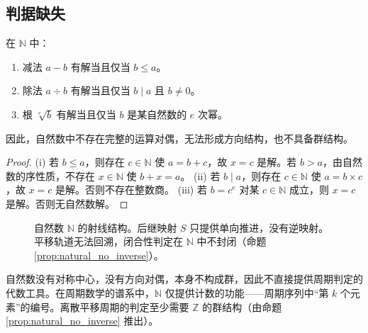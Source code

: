 \subsection{\texorpdfstring{判据缺失}{判据缺失}}

\begin{proposition}[自然数中逆运算的缺失]\label{prop:natural_no_inverse}
在 $\mathbb{N}$ 中：
\begin{enumerate}[label=(\roman*)]
    \item 减法 $a - b$ 有解当且仅当 $b \le a$。
    \item 除法 $a \div b$ 有解当且仅当 $b \mid a$ 且 $b \neq 0$。
    \item 根 $\sqrt[e]{b}$ 有解当且仅当 $b$ 是某自然数的 $e$ 次幂。
\end{enumerate}
因此，自然数中不存在完整的运算对偶，无法形成方向结构，也不具备群结构。
\end{proposition}

\begin{proof}
(i) 若 $b \le a$，则存在 $c \in \mathbb{N}$ 使 $a = b + c$，故 $x = c$ 是解。若 $b > a$，由自然数的序性质，不存在 $x \in \mathbb{N}$ 使 $b + x = a$。
(ii) 若 $b \mid a$，则存在 $c \in \mathbb{N}$ 使 $a = b \times c$，故 $x = c$ 是解。否则不存在整数商。
(iii) 若 $b = c^e$ 对某 $c \in \mathbb{N}$ 成立，则 $x = c$ 是解。否则无自然数解。
\end{proof}

\begin{figure}[htbp]
    \centering
    \caption{自然数 $\mathbb{N}$ 的射线结构。后继映射 $S$ 只提供单向推进，没有逆映射。平移轨道无法回溯，闭合性判定在 $\mathbb{N}$ 中不封闭（命题 \ref{prop:natural_no_inverse}）。}
    \label{fig:natural_ray}
\end{figure}
\begin{corollary}[自然数与周期判定的关系]\label{cor:natural_period}
自然数没有对称中心，没有方向对偶，本身不构成群，因此不直接提供周期判定的代数工具。在周期数学的谱系中，$\mathbb{N}$ 仅提供计数的功能——周期序列中“第 $k$ 个元素”的编号。离散平移周期的判定至少需要 $\mathbb{Z}$ 的群结构（由命题 \ref{prop:natural_no_inverse} 推出）。
\end{corollary}

